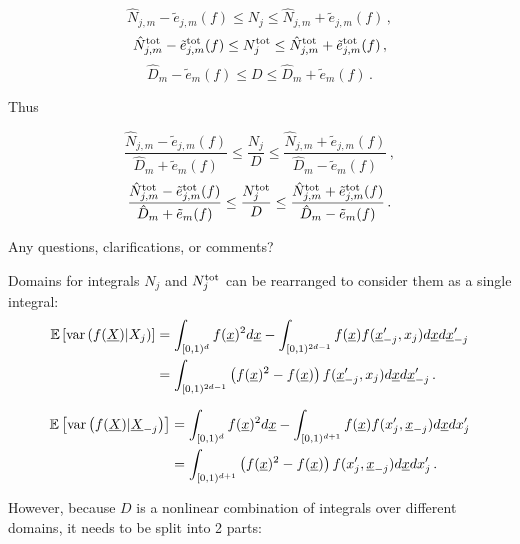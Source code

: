 \documentclass[]{amsart}
\newcommand{\oerr}{e}
\begin{document}
$$\hat{N}_{j,m}-\tilde{\oerr}_{j,m}(f) \leq N_j \leq \hat{N}_{j,m}+\tilde{\oerr}_{j,m}(f)  \, ,$$
$$\hat{N}_{j,m}^{\textup{tot}}-\tilde{\oerr}_{j,m}^{\textup{tot}}(f) \leq N_j^{\textup{tot}} \leq \hat{N}_{j,m}^{\textup{tot}}+\tilde{\oerr}_{j,m}^{\textup{tot}}(f) \, ,$$
$$\hat{D}_{m}-\tilde{\oerr}_{m}(f) \leq D \leq \hat{D}_{m}+\tilde{\oerr}_{m}(f)  \, .$$


Thus

\begin{equation}\label{err_bound_j}
\frac{\hat{N}_{j,m}-\tilde{\oerr}_{j,m}(f)}{\hat{D}_{m}+\tilde{\oerr}_{m}(f) } \leq \frac{N_j}{D} \leq \frac{\hat{N}_{j,m}+\tilde{\oerr}_{j,m}(f)}{\hat{D}_{m}-\tilde{\oerr}_{m}(f) }\, ,
\end{equation}
\begin{equation}\label{err_bound_jtot}
\frac{\hat{N}_{j,m}^{\textup{tot}}-\tilde{\oerr}_{j,m}^{\textup{tot}}(f) }{\hat{D}_{m}+\tilde{\oerr}_{m}(f)} \leq \frac{N_{j}^{\textup{tot}}}{D} \leq \frac{ \hat{N}_{j,m}^{\textup{tot}}+\tilde{\oerr}_{j,m}^{\textup{tot}}(f)}{\hat{D}_{m}-\tilde{\oerr}_{m}(f)} \, .
\end{equation}

\bigskip

Any questions, clarifications, or comments?

Domains for integrals $N_j$ and $N_j^{\textup{tot}}$ can be rearranged to consider them as a single integral:
\begin{align*}
\mathbb{E}\left[ \operatorname{var} \left(f(\underline{X})|X_j\right)\right] & = \int_{[0,1)^d}f(\underline{x})^2 d \underline{x} - \int_{[0,1)^{2d-1}}f(\underline{x})f(\underline{x}'_{-j},x_j)d \underline{x} d \underline{x}'_{-j} \\
& = \int_{[0,1)^{2d-1}}\left(f(\underline{x})^2-f(\underline{x})\right)f(\underline{x}'_{-j},x_j)d \underline{x} d \underline{x}'_{-j} \, . 
\end{align*}

\begin{align*}
\mathbb{E}\left[ \operatorname{var} \left(f(\underline{X})|\underline{X}_{-j}\right)\right] & = \int_{[0,1)^d}f(\underline{x})^2 d \underline{x} - \int_{[0,1)^{d+1}}f(\underline{x})f(x'_{j},\underline{x}_{-j})d \underline{x} d {x}'_{j} \\
& = \int_{[0,1)^{d+1}}\left(f(\underline{x})^2-f(\underline{x})\right)f(x'_{j},\underline{x}_{-j})d \underline{x} d {x}'_{j} \, . 
\end{align*}

However, because $D$ is a nonlinear combination of integrals over different domains, it needs to be split into 2 parts:
\end{document}
